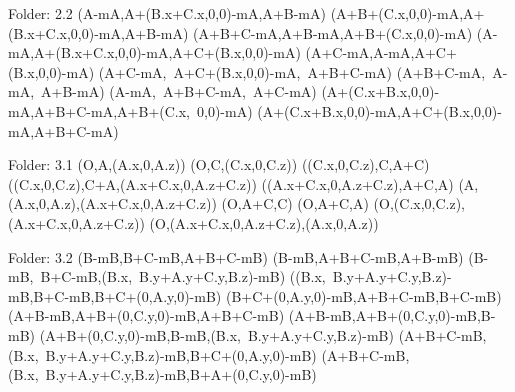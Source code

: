 Folder: 2.2
\left(A-mA,A+\left(B.x+C.x,0,0\right)-mA,A+B-mA\right)
\left(A+B+\left(C.x,0,0\right)-mA,A+\left(B.x+C.x,0,0\right)-mA,A+B-mA\right)
\left(A+B+C-mA,A+B-mA,A+B+\left(C.x,0,0\right)-mA\right)
\left(A-mA,A+\left(B.x+C.x,0,0\right)-mA,A+C+\left(B.x,0,0\right)-mA\right)
\left(A+C-mA,A-mA,A+C+\left(B.x,0,0\right)-mA\right)
\left(A+C-mA,\ A+C+\left(B.x,0,0\right)-mA,\ A+B+C-mA\right)
\left(A+B+C-mA,\ A-mA,\ A+B-mA\right)
\left(A-mA,\ A+B+C-mA,\ A+C-mA\right)
\left(A+\left(C.x+B.x,0,0\right)-mA,A+B+C-mA,A+B+\left(C.x,\ 0,0\right)-mA\right)
\left(A+\left(C.x+B.x,0,0\right)-mA,A+C+\left(B.x,0,0\right)-mA,A+B+C-mA\right)


Folder: 3.1
\left(O,A,\left(A.x,0,A.z\right)\right)
\left(O,C,\left(C.x,0,C.z\right)\right)
\left(\left(C.x,0,C.z\right),C,A+C\right)
\left(\left(C.x,0,C.z\right),C+A,\left(A.x+C.x,0,A.z+C.z\right)\right)
\left(\left(A.x+C.x,0,A.z+C.z\right),A+C,A\right)
\left(A,\left(A.x,0,A.z\right),\left(A.x+C.x,0,A.z+C.z\right)\right)
\left(O,A+C,C\right)
\left(O,A+C,A\right)
\left(O,\left(C.x,0,C.z\right),\left(A.x+C.x,0,A.z+C.z\right)\right)
\left(O,\left(A.x+C.x,0,A.z+C.z\right),\left(A.x,0,A.z\right)\right)


Folder: 3.2
\left(B-mB,B+C-mB,A+B+C-mB\right)
\left(B-mB,A+B+C-mB,A+B-mB\right)
\left(B-mB,\ B+C-mB,\left(B.x,\ B.y+A.y+C.y,B.z\right)-mB\right)
\left(\left(B.x,\ B.y+A.y+C.y,B.z\right)-mB,B+C-mB,B+C+\left(0,A.y,0\right)-mB\right)
\left(B+C+\left(0,A.y,0\right)-mB,A+B+C-mB,B+C-mB\right)
\left(A+B-mB,A+B+\left(0,C.y,0\right)-mB,A+B+C-mB\right)
\left(A+B-mB,A+B+\left(0,C.y,0\right)-mB,B-mB\right)
\left(A+B+\left(0,C.y,0\right)-mB,B-mB,\left(B.x,\ B.y+A.y+C.y,B.z\right)-mB\right)
\left(A+B+C-mB,\left(B.x,\ B.y+A.y+C.y,B.z\right)-mB,B+C+\left(0,A.y,0\right)-mB\right)
\left(A+B+C-mB,\left(B.x,\ B.y+A.y+C.y,B.z\right)-mB,B+A+\left(0,C.y,0\right)-mB\right)


